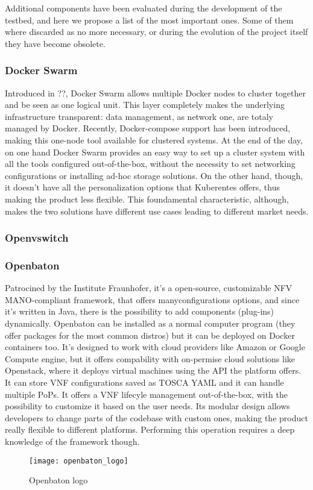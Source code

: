 Additional components have been evaluated during the development of the 
testbed, and here we propose a list of the most important ones. Some of them 
where discarded as no more necessary, or during the evolution of the project 
itself they have become obsolete.

\subsubsection{Docker Swarm}
\label{chap:prjan:sec:tech:sub:other:sub:swarm}
Introduced in ??, Docker Swarm allows 
multiple Docker nodes to cluster together and be seen as one logical unit. This 
layer completely makes the underlying infrastructure transparent: data 
management, as network one, are totaly managed by Docker. Recently, 
Docker-compose support has been introduced, making this one-node tool available 
for clustered systems. At the end of the day, on one hand Docker Swarm provides 
an easy way to set up a cluster system with all the tools configured 
out-of-the-box, without the necessity to set networking configurations or 
installing ad-hoc storage solutions. On the other hand, though, it doesn't have 
all the personalization options that Kuberentes offers, thus making the product 
less flexible. This foundamental characteristic, although, makes the two 
solutions have different use cases leading to different market needs.

\subsubsection{Openvswitch} 
\subsubsection{Openbaton}
\label{chap:prjan:sec:tech:sub:other:sub:openbaton}
Patrocined by the Institute Fraunhofer, it's a open-source, customizable NFV 
MANO-compliant framework, that offers manyconfigurations options, and since 
it's 
written in Java, there is the possibility to add components (plug-ins) 
dynamically. Openbaton can be installed as a normal computer program (they 
offer packages for the most common distros) but it can be deployed on Docker 
containers too. It's designed to work with cloud providers like Amazon or 
Google Compute engine, but it offers compability with on-permise cloud 
solutions like Openstack, where it deploys virtual machines using the API
the platform offers. It can store VNF configurations saved as TOSCA
YAML and it can handle multiple
PoPs. It offers a VNF lifecyle management
out-of-the-box, with the possibility to customize it based on the user needs.
Its modular design allows developers to change parts of the codebase with custom
ones, making the product really flexible to different platforms. Performing this
operation requires a deep knowledge of the framework though.
\begin{figure}[h]
 \centering \texttt{[image: openbaton\_logo]}
 \caption{Openbaton logo}
 \label{chap:prjan:img:openbaton_logo}
\end{figure}
